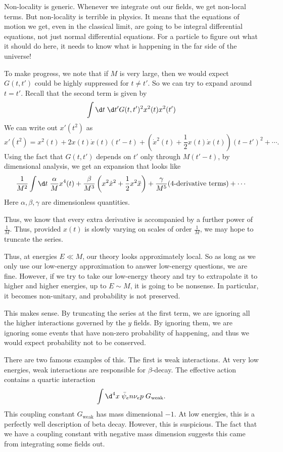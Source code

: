 \documentclass[a4paper]{article}
\begin{document}
Non-locality is generic. Whenever we integrate out our fields, we get non-local terms. But non-locality is terrible in physics. It means that the equations of motion we get, even in the classical limit, are going to be integral differential equations, not just normal differential equations. For a particle to figure out what it should do here, it needs to know what is happening in the far side of the universe!

To make progress, we note that if $M$ is very large, then we would expect $G(t, t')$ could be highly suppressed for $t \not= t'$. So we can try to expand around $t = t'$. Recall that the second term is given by
\[
  \int \d t\; \d t' G(t, t')^2 x^2(t) x^2(t')
\]
We can write out $x'(t^2)$ as
\[
  x'(t^2) = x^2 (t) + 2x(t) \dot{x}(t) (t' - t) + \left(\dot{x}^2(t) + \frac{1}{2} x(t) \dot{x}(t)\right) (t - t')^2 + \cdots.
\]
Using the fact that $G(t, t')$ depends on $t'$ only through $M(t' - t)$, by dimensional analysis, we get an expansion that looks like
\[
  \frac{1}{M^2} \int \d t\; \frac{\alpha}{M} x^4(t) + \frac{\beta}{M^3} \left(x^2 \dot{x}^2 + \frac{1}{2} x^2 \ddot{x}\right) + \frac{\gamma}{M^5} (\text{4-derivative terms}) + \cdots
\]
Here $\alpha, \beta, \gamma$ are dimensionless quantities.

Thus, we know that every extra derivative is accompanied by a further power of $\frac{1}{M}$. Thus, provided $x(t)$ is slowly varying on scales of order $\frac{1}{M}$, we may hope to truncate the series.

Thus, at energies $E \ll M$, our theory looks approximately local. So as long as we only use our low-energy approximation to answer low-energy questions, we are fine. However, if we try to take our low-energy theory and try to extrapolate it to higher and higher energies, up to $E \sim M$, it is going to be nonsense. In particular, it becomes non-unitary, and probability is not preserved.

This makes sense. By truncating the series at the first term, we are ignoring all the higher interactions governed by the $y$ fields. By ignoring them, we are ignoring some events that have non-zero probability of happening, and thus we would expect probability not to be conserved.

There are two famous examples of this. The first is weak interactions. At very low energies, weak interactions are responsible for $\beta$-decay. The effective action contains a quartic interaction
\[
  \int \d^4 x\; \bar\psi_e n \nu_e p \; G_{\mathrm{weak}}.
\]
This coupling constant $G_{\mathrm{weak}}$ has mass dimensional $-1$. At low energies, this is a perfectly well description of beta decay. However, this is suspicious. The fact that we have a coupling constant with negative mass dimension suggests this came from integrating some fields out.
\end{document}
